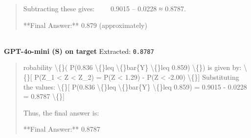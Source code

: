 \begin{tcolorbox}[
  colback=gray!5, colframe=gray!40,
  title={\textbf{Example 2: Pure Knowledge Bottleneck}},
  fonttitle=\small\bfseries, breakable]
\begin{quote}
Subtracting these gives:
  0.9015 – 0.0228 ≈ 0.8787.

**Final Answer:** 0.879 (approximately)\end{quote}
\\[-2pt]
\textbf{GPT-4o-mini (S) on target} \textcolor{red}{\xmark} Extracted: \texttt{0.8787}
\begin{quote}\scriptsize\ttfamily [...] robability \textbackslash\{\}( P(0.836 \textbackslash\{\}leq \textbackslash\{\}bar\{Y\} \textbackslash\{\}leq 0.859) \textbackslash\{\}) is given by:
   \textbackslash\{\}[
   P(Z\_1 < Z < Z\_2) = P(Z < 1.29) - P(Z < -2.00)
   \textbackslash\{\}]
   Substituting the values:
   \textbackslash\{\}[
   P(0.836 \textbackslash\{\}leq \textbackslash\{\}bar\{Y\} \textbackslash\{\}leq 0.859) = 0.9015 - 0.0228 = 0.8787
   \textbackslash\{\}]

Thus, the final answer is:

**Final Answer:** 0.8787\end{quote}
\\[-2pt]
\end{tcolorbox}
\vspace{8pt}
